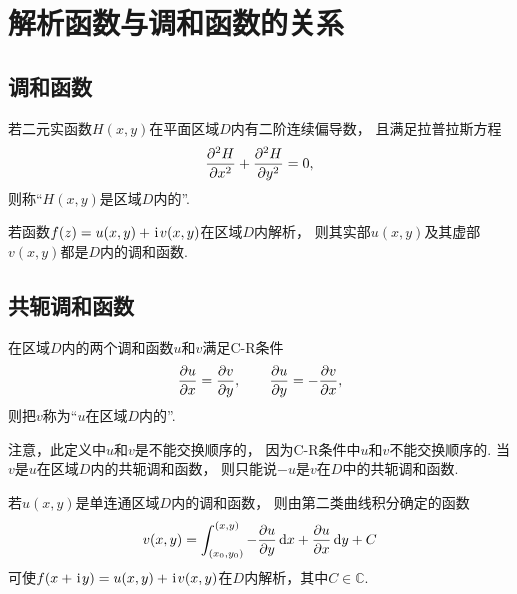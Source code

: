 \section{解析函数与调和函数的关系}
\subsection{调和函数}
\begin{definition}
若二元实函数\(H(x,y)\)在平面区域\(D\)内有二阶连续偏导数，
且满足拉普拉斯方程\[
	\pdv[2]{H}{x} + \pdv[2]{H}{y} = 0,
\]
则称“\(H(x,y)\)是区域\(D\)内的”.
\end{definition}

\begin{theorem}
若函数\(f(z)=u(x,y)+\kern1pt\mathrm{i}\kern1pt v(x,y)\)在区域\(D\)内解析，
则其实部\(u(x,y)\)及其虚部\(v(x,y)\)都是\(D\)内的调和函数.
\end{theorem}

\subsection{共轭调和函数}
\begin{definition}
在区域\(D\)内的两个调和函数\(u\)和\(v\)满足C-R条件\[
	\pdv{u}{x}=\pdv{v}{y}, \qquad
	\pdv{u}{y}=-\pdv{v}{x},
\]
则把\(v\)称为“\(u\)在区域\(D\)内的”.
\end{definition}
注意，此定义中\(u\)和\(v\)是不能交换顺序的，
因为C-R条件中\(u\)和\(v\)不能交换顺序的.
当\(v\)是\(u\)在区域\(D\)内的共轭调和函数，
则只能说\(-u\)是\(v\)在\(D\)中的共轭调和函数.

\begin{theorem}
若\(u(x,y)\)是单连通区域\(D\)内的调和函数，
则由第二类曲线积分确定的函数\[
	v(x,y)
	= \int_{(x_0,y_0)}^{(x,y)}
		-\pdv{u}{y} \dd{x} + \pdv{u}{x} \dd{y} + C
\]
可使\(f(x+\kern1pt\mathrm{i}\kern1pt y)=u(x,y)+\kern1pt\mathrm{i}\kern1pt v(x,y)\)在\(D\)内解析，其中\(C\in\mathbb{C}\).
\end{theorem}
